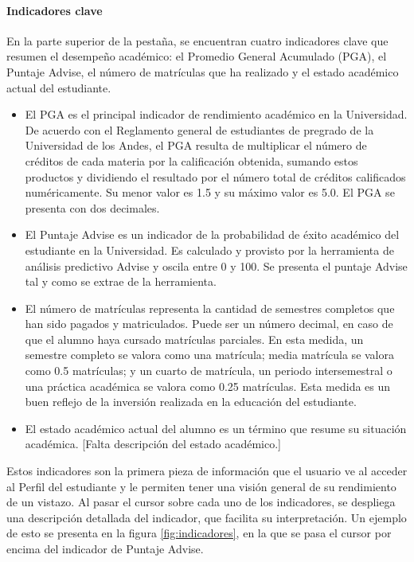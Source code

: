 \paragraph{Indicadores clave} En la parte superior de la pestaña, se encuentran cuatro indicadores clave que resumen el desempeño académico: el Promedio General Acumulado (PGA), el Puntaje Advise, el número de matrículas que ha realizado y el estado académico actual del estudiante.
\begin{itemize}
  \item El PGA es el principal indicador de rendimiento académico en la Universidad. De acuerdo con el Reglamento general de estudiantes de pregrado de la Universidad de los Andes, el PGA resulta de multiplicar el número de créditos de cada materia por la calificación obtenida, sumando estos productos y dividiendo el resultado por el número total de créditos calificados numéricamente. 
  Su menor valor es 1.5 y su máximo valor es 5.0. El PGA se presenta con dos decimales.
  \item El Puntaje Advise es un indicador de la probabilidad de éxito académico del estudiante en la Universidad. Es calculado y provisto por la herramienta de análisis predictivo Advise y oscila entre 0 y 100. Se presenta el puntaje Advise tal y como se extrae de la herramienta.
  \item El número de matrículas representa la cantidad de semestres completos que han sido pagados y matriculados. Puede ser un número decimal, en caso de que el alumno haya cursado matrículas parciales. En esta medida, un semestre completo se valora como una matrícula; media matrícula se valora como 0.5 matrículas; y un cuarto de matrícula, un periodo intersemestral o una práctica académica se valora como 0.25 matrículas. Esta medida es un buen reflejo de la inversión realizada en la educación del estudiante.
  \item El estado académico actual del alumno es un término que resume su situación académica. [Falta descripción del estado académico.]
\end{itemize}

Estos indicadores son la primera pieza de información que el usuario ve al acceder al Perfil del estudiante y le permiten tener una visión general de su rendimiento de un vistazo. Al pasar el cursor sobre cada uno de los indicadores, se despliega una descripción detallada del indicador, que facilita su interpretación. Un ejemplo de esto se presenta en la figura \ref{fig:indicadores}, en la que se pasa el cursor por encima del indicador de Puntaje Advise.

